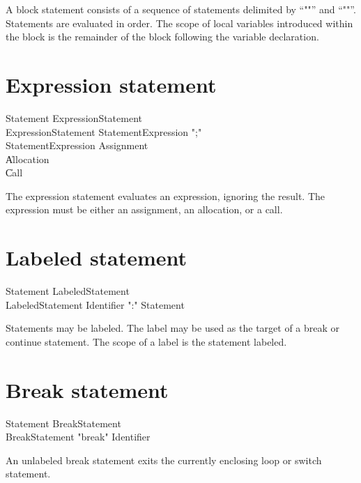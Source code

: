 A block statement consists of a sequence of statements delimited
by ``\xcd"{"'' and ``\xcd"}"''.  Statements are evaluated in
order.  The scope of local variables introduced within the block  
is the remainder of the block following the variable declaration.

\section{Expression statement}

\begin{grammar}
Statement \: ExpressionStatement \\
ExpressionStatement \: StatementExpression \xcd";" \\
StatementExpression \: Assignment \\
          \| Allocation \\
          \| Call \\
\end{grammar}

The expression statement evaluates an expression, ignoring the
result.  The expression must be either an assignment, an
allocation, or a call.

\section{Labeled statement}

\begin{grammar}
Statement \: LabeledStatement \\
LabeledStatement \: Identifier \xcd":" Statement \\
\end{grammar}

Statements may be labeled.  The label may be used as the target
of a break or continue statement.  The scope of a label is the
statement labeled.

\section{Break statement}

\begin{grammar}
Statement \: BreakStatement \\
BreakStatement \: \xcd"break" Identifier\opt \\
\end{grammar}

An unlabeled break statement exits the currently enclosing loop
or switch statement.

